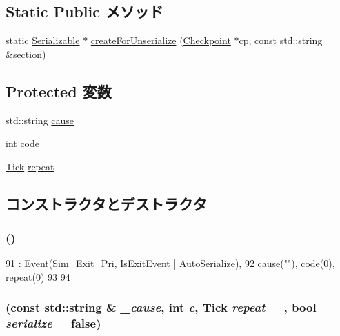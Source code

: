 \subsection*{Static Public メソッド}
\begin{DoxyCompactItemize}
\item 
static \hyperlink{classSerializable}{Serializable} $\ast$ \hyperlink{classLocalSimLoopExitEvent_a1a972a5fa41c60f01855124f20e22959}{createForUnserialize} (\hyperlink{classCheckpoint}{Checkpoint} $\ast$cp, const std::string \&section)
\end{DoxyCompactItemize}
\subsection*{Protected 変数}
\begin{DoxyCompactItemize}
\item 
std::string \hyperlink{classLocalSimLoopExitEvent_ae4eec0077e30624726ddd2a0947962e5}{cause}
\item 
int \hyperlink{classLocalSimLoopExitEvent_a45a5b7c00a796a23f01673cef1dbe0a9}{code}
\item 
\hyperlink{base_2types_8hh_a5c8ed81b7d238c9083e1037ba6d61643}{Tick} \hyperlink{classLocalSimLoopExitEvent_a186e97c430ff343e8ab14129eaa8375d}{repeat}
\end{DoxyCompactItemize}


\subsection{コンストラクタとデストラクタ}
\hypertarget{classLocalSimLoopExitEvent_ae315899569f1c07a8f93478d48046c97}{
\subsubsection[{LocalSimLoopExitEvent}]{ ()}}
\label{classLocalSimLoopExitEvent_ae315899569f1c07a8f93478d48046c97}



\begin{DoxyCode}
91     : Event(Sim_Exit_Pri, IsExitEvent | AutoSerialize),
92       cause(""), code(0), repeat(0)
93 {
94 }
\end{DoxyCode}
\hypertarget{classLocalSimLoopExitEvent_aa58357821a2996d059c18c0c8c6d40d9}{
\subsubsection[{LocalSimLoopExitEvent}]{ (const std::string \& {\em \_\-cause}, \/  int {\em c}, \/  {\bf Tick} {\em repeat} = {}, \/  bool {\em serialize} = {\ttfamily false})}}
\label{classLocalSimLoopExitEvent_aa58357821a2996d059c18c0c8c6d40d9}



